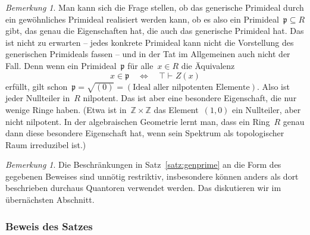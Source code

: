 \documentclass[a4paper,ngerman,12pt]{scrartcl}
\theoremstyle{definition}
\theoremstyle{plain}
\theoremstyle{remark}
\newtheorem{bem}[defn]{Bemerkung}
\newcommand{\ZZ}{\mathbb{Z}}
\newcommand{\pp}{\mathfrak{p}}
\newcommand{\seq}[1]{\mathrel{\vdash\!\!\!_{#1}}}
\renewcommand{\_}{\mathpunct{.}\,}
\newcommand{\?}{\,{:}\,}
\begin{document}
\begin{bem}
Man kann sich die Frage stellen, ob das generische Primideal durch ein
gewöhnliches Primideal realisiert werden kann, ob es also ein Primideal~$\pp
\subseteq R$ gibt, das genau die Eigenschaften hat, die auch das generische
Primideal hat. Das ist nicht zu erwarten -- jedes konkrete Primideal kann nicht
die Vorstellung des generischen Primideals fassen -- und in der Tat im
Allgemeinen auch nicht der Fall. Denn wenn ein Primideal~$\pp$ für alle~$x \in
R$ die Äquivalenz
\[ x \in \pp \quad\Longleftrightarrow\quad \top \seq{} Z(x) \]
erfüllt, gilt schon~$\pp = \sqrt{(0)} = (\text{Ideal aller nilpotenten
Elemente})$. Also ist jeder Nullteiler in~$R$ nilpotent. Das ist aber eine
besondere Eigenschaft, die nur wenige Ringe haben. (Etwa ist in~$\ZZ \times
\ZZ$ das Element~$(1,0)$ ein Nullteiler, aber nicht nilpotent. In der
algebraischen Geometrie lernt man, dass ein Ring~$R$ genau dann diese besondere
Eigenschaft hat, wenn sein Spektrum als topologischer Raum irreduzibel ist.)
\end{bem}

\begin{bem}Die Beschränkungen in Satz~\ref{satz:genprime} an die Form des
gegebenen Beweises sind unnötig restriktiv, insbesondere können anders als dort
beschrieben durchaus Quantoren verwendet werden. Das diskutieren wir im
übernächsten Abschnitt.\end{bem}


\subsubsection*{Beweis des Satzes}
\end{document}
